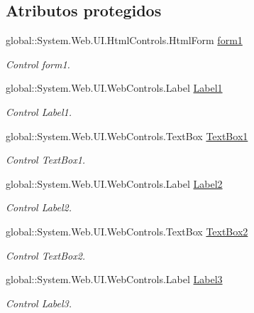\subsection*{Atributos protegidos}
\begin{DoxyCompactItemize}
\item 
global\+::\+System.\+Web.\+U\+I.\+Html\+Controls.\+Html\+Form \mbox{\hyperlink{classInicio_1_1Alumno_1_1InstanciarTarea_a294c0a36ba084c79f067abd0d7cf5852}{form1}}
\begin{DoxyCompactList}\small\item\em Control form1. \end{DoxyCompactList}\item 
global\+::\+System.\+Web.\+U\+I.\+Web\+Controls.\+Label \mbox{\hyperlink{classInicio_1_1Alumno_1_1InstanciarTarea_a7cec989b595682dc3e86dcf9d66bb85a}{Label1}}
\begin{DoxyCompactList}\small\item\em Control Label1. \end{DoxyCompactList}\item 
global\+::\+System.\+Web.\+U\+I.\+Web\+Controls.\+Text\+Box \mbox{\hyperlink{classInicio_1_1Alumno_1_1InstanciarTarea_a21afc2c731dc3af4dd47991ca901261a}{Text\+Box1}}
\begin{DoxyCompactList}\small\item\em Control Text\+Box1. \end{DoxyCompactList}\item 
global\+::\+System.\+Web.\+U\+I.\+Web\+Controls.\+Label \mbox{\hyperlink{classInicio_1_1Alumno_1_1InstanciarTarea_a378777bb096371da6b8e9491d177413d}{Label2}}
\begin{DoxyCompactList}\small\item\em Control Label2. \end{DoxyCompactList}\item 
global\+::\+System.\+Web.\+U\+I.\+Web\+Controls.\+Text\+Box \mbox{\hyperlink{classInicio_1_1Alumno_1_1InstanciarTarea_a7e0031538f14b48418c1eacc914e722f}{Text\+Box2}}
\begin{DoxyCompactList}\small\item\em Control Text\+Box2. \end{DoxyCompactList}\item 
global\+::\+System.\+Web.\+U\+I.\+Web\+Controls.\+Label \mbox{\hyperlink{classInicio_1_1Alumno_1_1InstanciarTarea_afcd4d40d67e11759334a9f8bcf74815a}{Label3}}
\begin{DoxyCompactList}\small\item\em Control Label3. \end{DoxyCompactList}\item 

\end{DoxyCompactItemize}
